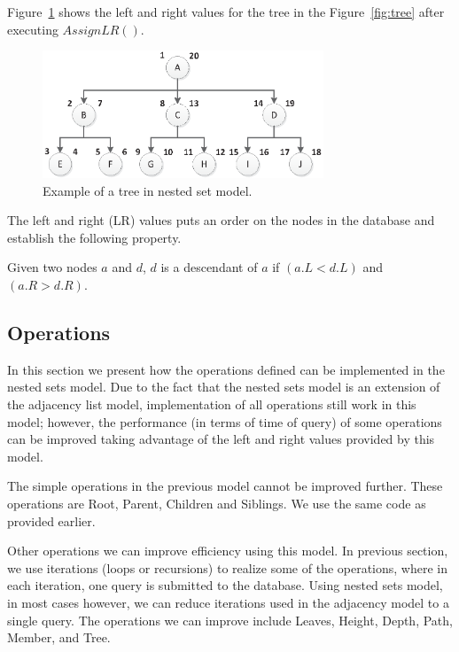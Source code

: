 Figure~\ref{fig:tree-lr} shows the left and right values for the tree in the Figure~\ref{fig:tree} after executing $AssignLR()$.

\begin{figure}[H]
\begin{center}
\includegraphics[width=3.3in]{images/tree-lr.eps}
\caption{Example of a tree in nested set model.\label{fig:tree-lr}}
\end{center}
\end{figure}

The left and right (LR) values puts an order on the nodes in the database and establish the following property.

\begin{property}\label{p_ns_desc}
Given two nodes $a$ and $d$, $d$ is a descendant of $a$ if $(a.L < d.L)$ and $(a.R > d.R)$.
\end{property}


\subsection{Operations}

In this section we present how the operations defined can be implemented in the nested sets model. Due to the fact that the nested sets model is an extension of the adjacency list model, implementation of all operations still work in this model; however, the performance (in terms of time of query) of some operations can be improved taking advantage of the left and right values provided by this model.

The simple operations in the previous model cannot be improved further. These operations are Root, Parent, Children and Siblings. We use the same code as provided earlier.


Other operations we can improve efficiency using this model. In previous section, we use iterations (loops or recursions) to realize some of the operations, where in each iteration, one query is submitted to the database. Using nested sets model, in most cases however, we can reduce iterations used in the adjacency model to a single query. The operations we can improve include Leaves, Height, Depth, Path, Member, and Tree.


